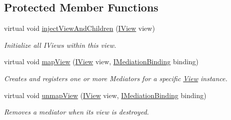 \subsection*{Protected Member Functions}
\begin{DoxyCompactItemize}
\item 
\hypertarget{classstrange_1_1extensions_1_1mediation_1_1impl_1_1_mediation_binder_a01f172fc7a3cd0a45a44568a65e62a4f}{virtual void \hyperlink{classstrange_1_1extensions_1_1mediation_1_1impl_1_1_mediation_binder_a01f172fc7a3cd0a45a44568a65e62a4f}{inject\-View\-And\-Children} (\hyperlink{interfacestrange_1_1extensions_1_1mediation_1_1api_1_1_i_view}{I\-View} view)}\label{classstrange_1_1extensions_1_1mediation_1_1impl_1_1_mediation_binder_a01f172fc7a3cd0a45a44568a65e62a4f}

\begin{DoxyCompactList}\small\item\em Initialize all I\-Views within this view. \end{DoxyCompactList}\item 
virtual void \hyperlink{classstrange_1_1extensions_1_1mediation_1_1impl_1_1_mediation_binder_a8f43c7f8bf7b41f12f7b453bcbfc5fcd}{map\-View} (\hyperlink{interfacestrange_1_1extensions_1_1mediation_1_1api_1_1_i_view}{I\-View} view, \hyperlink{interfacestrange_1_1extensions_1_1mediation_1_1api_1_1_i_mediation_binding}{I\-Mediation\-Binding} binding)
\begin{DoxyCompactList}\small\item\em Creates and registers one or more Mediators for a specific \hyperlink{classstrange_1_1extensions_1_1mediation_1_1impl_1_1_view}{View} instance. \end{DoxyCompactList}\item 
\hypertarget{classstrange_1_1extensions_1_1mediation_1_1impl_1_1_mediation_binder_ac920c35b85c82588c9d847e494159a18}{virtual void \hyperlink{classstrange_1_1extensions_1_1mediation_1_1impl_1_1_mediation_binder_ac920c35b85c82588c9d847e494159a18}{unmap\-View} (\hyperlink{interfacestrange_1_1extensions_1_1mediation_1_1api_1_1_i_view}{I\-View} view, \hyperlink{interfacestrange_1_1extensions_1_1mediation_1_1api_1_1_i_mediation_binding}{I\-Mediation\-Binding} binding)}\label{classstrange_1_1extensions_1_1mediation_1_1impl_1_1_mediation_binder_ac920c35b85c82588c9d847e494159a18}

\begin{DoxyCompactList}\small\item\em Removes a mediator when its view is destroyed. \end{DoxyCompactList}\end{DoxyCompactItemize}
